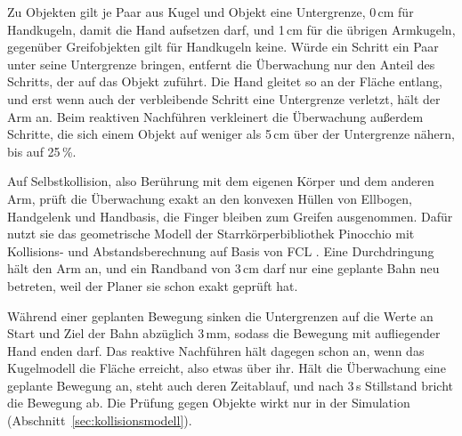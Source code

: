 Zu Objekten gilt je Paar aus Kugel und Objekt eine Untergrenze, 0\,cm für Handkugeln, damit die Hand aufsetzen darf, und 1\,cm für die übrigen Armkugeln, gegenüber Greifobjekten gilt für Handkugeln keine.
Würde ein Schritt ein Paar unter seine Untergrenze bringen, entfernt die Überwachung nur den Anteil des Schritts, der auf das Objekt zuführt.
Die Hand gleitet so an der Fläche entlang, und erst wenn auch der verbleibende Schritt eine Untergrenze verletzt, hält der Arm an.
Beim reaktiven Nachführen verkleinert die Überwachung außerdem Schritte, die sich einem Objekt auf weniger als 5\,cm über der Untergrenze nähern, bis auf 25\,\%.

Auf Selbstkollision, also Berührung mit dem eigenen Körper und dem anderen Arm, prüft die Überwachung exakt an den konvexen Hüllen von Ellbogen, Handgelenk und Handbasis, die Finger bleiben zum Greifen ausgenommen.
Dafür nutzt sie das geometrische Modell der Starrkörperbibliothek Pinocchio mit Kollisions- und Abstandsberechnung auf Basis von FCL \cite{Carpentier2019}.
Eine Durchdringung hält den Arm an, und ein Randband von 3\,cm darf nur eine geplante Bahn neu betreten, weil der Planer sie schon exakt geprüft hat.

Während einer geplanten Bewegung sinken die Untergrenzen auf die Werte an Start und Ziel der Bahn abzüglich 3\,mm, sodass die Bewegung mit aufliegender Hand enden darf.
Das reaktive Nachführen hält dagegen schon an, wenn das Kugelmodell die Fläche erreicht, also etwas über ihr.
Hält die Überwachung eine geplante Bewegung an, steht auch deren Zeitablauf, und nach 3\,s Stillstand bricht die Bewegung ab.
Die Prüfung gegen Objekte wirkt nur in der Simulation (Abschnitt~\ref{sec:kollisionsmodell}).

